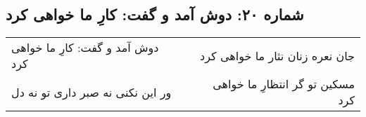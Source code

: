 \begin{center}
\section*{شماره ۲۰: دوش آمد و گفت: کارِ ما خواهی کرد}
\label{sec:020}
\begin{longtable}{l p{0.5cm} r}
دوش آمد و گفت: کارِ ما خواهی کرد
&&
جان نعره زنان نثار ما خواهی کرد
\\
ور این نکنی نه صبر داری تو نه دل
&&
مسکین تو گر انتظارِ ما خواهی کرد
\\
\end{longtable}
\end{center}
